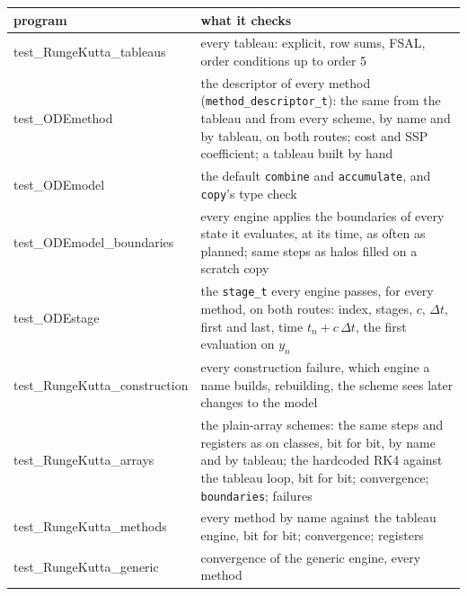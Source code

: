 \documentclass[11pt,a4paper]{article}
\newcommand{\dt}{\Delta t}
\newcommand{\code}[1]{\texttt{#1}}
\begin{document}
\begin{center}
\renewcommand{\arraystretch}{1.2}
\begin{tabular}{>{\ttfamily}l p{8.6cm}}
  \toprule
  \normalfont program & what it checks \\
  \midrule
  test\_RungeKutta\_tableaus     & every tableau: explicit, row sums, FSAL, order conditions
                                   up to order 5 \\
  test\_ODEmethod                & the descriptor of every method (\code{method\_descriptor\_t}): the
                                   same from the tableau and from every scheme, by name and by
                                   tableau, on both routes; cost and SSP coefficient; a tableau
                                   built by hand \\
  test\_ODEmodel                 & the default \code{combine} and \code{accumulate},
                                   and \code{copy}'s type check \\
  test\_ODEmodel\_boundaries       & every engine applies the boundaries of every state it evaluates, at its
                                   time, as often as planned; same steps as halos filled on
                                   a scratch copy \\
  test\_ODEstage                 & the \code{stage\_t} every engine passes, for every method, on
                                   both routes: index, stages, $c$, $\dt$, first and last, time
                                   $t_n + c\,\dt$, the first evaluation on $y_n$ \\
  test\_RungeKutta\_construction & every construction failure, which engine a name builds,
                                   rebuilding, the scheme sees later changes to the model \\
  test\_RungeKutta\_arrays       & the plain-array schemes: the same steps and registers as on
                                   classes, bit for bit, by name and by tableau; the hardcoded RK4
                                   against the tableau loop, bit for bit; convergence;
                                   \code{boundaries}; failures \\
  test\_RungeKutta\_methods      & every method by name against the tableau engine, bit for bit;
                                   convergence; registers \\
  test\_RungeKutta\_generic      & convergence of the generic engine, every method \\
  \bottomrule
\end{tabular}
\end{center}
\end{document}
